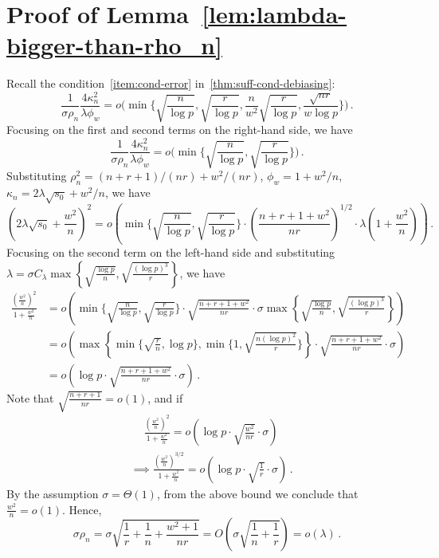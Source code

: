 \documentclass[11pt]{article}
\begin{document}
\section{Proof of Lemma~\ref{lem:lambda-bigger-than-rho_n}}\label{pf:lambda-bigger-than-rho_n}
Recall the condition~\ref{item:cond-error} in~\ref{thm:suff-cond-debiasing}:
\[
\frac{1}{\sigma\rho_n}\frac{4\kappa_n^2}{\lambda\phi_w} = o\bigg(\min\bigg\{\sqrt{\frac{n}{\log p}},\sqrt{\frac{r}{\log p}},\frac{n}{w^2}\sqrt{\frac{r}{\log p}},\frac{\sqrt{nr}}{w\log p}\bigg\}\bigg)\,.
\]
Focusing on the first and second terms on the right-hand side, we have
\[
\frac{1}{\sigma\rho_n}\frac{4\kappa_n^2}{\lambda\phi_w} = o\bigg(\min\bigg\{\sqrt{\frac{n}{\log p}},\sqrt{\frac{r}{\log p}}\bigg\}\bigg)\,.
\]
Substituting $\rho_n^2 = (n+r+1)/(nr)+w^2/(nr)$, $\phi_w = 1+w^2/n$, $\kappa_n = 2\lambda\sqrt{s_0}+w^2/n$, we have
\[
\left(2\lambda\sqrt{s_0}+\frac{w^2}{n}\right)^2 = o\left(\min\bigg\{\sqrt{\frac{n}{\log p}},\sqrt{\frac{r}{\log p}}\bigg\}\cdot\left(\frac{n+r+1+w^2}{nr}\right)^{1/2}\cdot \lambda\left(1+\frac{w^2}{n}\right) \right)\,.
\]
Focusing on the second term on the left-hand side and substituting $\lambda = \sigma C_\lambda \max\left\{\sqrt{\frac{\log p}{n}},\sqrt{\frac{(\log p)^3}{r}}\right\}$, we have 
\begin{align*}
    \frac{\left(\frac{w^2}{n}\right)^2}{1+\frac{w^2}{n}} &= o\left(\min\bigg\{\sqrt{\frac{n}{\log p}},\sqrt{\frac{r}{\log p}}\bigg\}\cdot\sqrt{\frac{n+r+1+w^2}{nr}}\cdot\sigma\max\left\{\sqrt{\frac{\log p}{n}},\sqrt{\frac{(\log p)^3}{r}}\right\}\right)\\
    &=o\left(\max\left\{\min\bigg\{\sqrt{\frac{r}{n}},\log p\bigg\},\min\bigg\{1,\sqrt{\frac{n(\log p)^2}{r}}\bigg\}\right\}\cdot\sqrt{\frac{n+r+1+w^2}{nr}}\cdot\sigma\right)\\
    &=o\left(\log p\cdot\sqrt{\frac{n+r+1+w^2}{nr}}\cdot\sigma\right)\,.
\end{align*}
Note that $\sqrt{\frac{n+r+1}{nr}}=o(1)$, and if
\begin{align*}
    &\quad \ \frac{\left(\frac{w^2}{n}\right)^2}{1+\frac{w^2}{n}} =o\left(\log p \cdot\sqrt{\frac{w^2}{nr}} \cdot \sigma\right)\\
    &\implies  \frac{\left(\frac{w^2}{n}\right)^{3/2}}{1+\frac{w^2}{n}} =o\left(\log p \cdot\sqrt{\frac{1}{r}} \cdot \sigma\right)\,.
\end{align*}
By the assumption $\sigma =\Theta(1)$, from the above bound  we conclude that $\frac{w^2}{n}=o(1)$. Hence, 
\[
\sigma\rho_n = \sigma\sqrt{\frac{1}{r}+\frac{1}{n}+\frac{w^2+1}{nr}}=O\left(\sigma\sqrt{\frac{1}{n}+\frac{1}{r}}\right)=o(\lambda)\,.
\]
\end{document}
